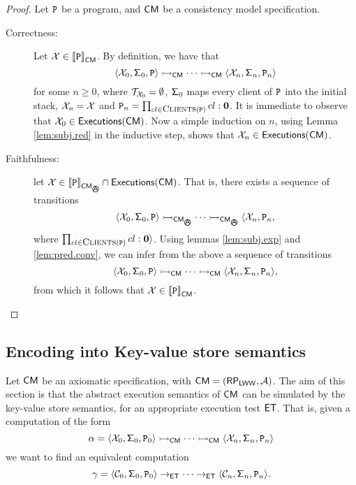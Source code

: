 \begin{proof}
Let $\texttt{P}$ be a program, and $\mathsf{CM}$ be a consistency model specification.
\begin{description}
\item[Correctness:] Let $\mathcal{X} \in {\llbracket \texttt{P}\rrbracket}_{\mathsf{CM}}$. By definition, we have that 
\[ 
\langle \mathcal{X}_0, \mathsf{\Sigma}_{0}, \texttt{P} \rangle \rightarrowtail_{\mathsf{CM}} \cdots \rightarrowtail_{\mathsf{CM}} \langle \mathcal{X}_{n}, \mathsf{\Sigma}_{n}, 
\texttt{P}_{n} \rangle 
\]
for some $n \geq 0$, where $\mathcal{T}_{\mathcal{X}_0} = \emptyset$, $\mathsf{\Sigma}_{0}$ maps every client of $\texttt{P}$ into the initial stack, 
$\mathcal{X}_n = \mathcal{X}$
and $\prog_{n} = \prod_{\tid \in \Clients(\prog)} \tid: \nil$. It is immediate to observe that 
$\mathcal{X}_0 \in {\mathsf{Executions}}(\mathsf{CM})$. Now a simple induction on $n$, using Lemma \ref{lem:subj.red} 
in the inductive step, shows that $\mathcal{X}_n \in {\mathsf{Executions}}(\mathsf{CM})$.
\item[Faithfulness:] let $\aexec \in \interpr{\prog}_{\CM_{\anarchicsmall}} \cap \aeset(\CM)$. 
That is, there exists a sequence of transitions 
\[
\langle \aexec_0, \thdstackFun_{0}, \prog \rangle \absrightarrow_{\CM_{\anarchicsmall}} \cdots \absrightarrow_{\CM_{\anarchicsmall}} \langle \aexec_{n}, \prog_n, 
\]
where $\prod_{\tid \in \Clients(\prog)} \tid: \nil \rangle$.
Using lemmas \ref{lem:subj.exp} and \ref{lem:pred.conv}, we can infer from the above a sequence of transitions
\[
\langle \mathcal{X}_0, \mathsf{\Sigma}_{0}, \texttt{P} \rangle \rightarrowtail_{\mathsf{CM}} \cdots \rightarrowtail_{\mathsf{CM}} \langle \mathcal{X}_{n}, \mathsf{\Sigma}_{n}, 
\texttt{P}_{n} \rangle,
\]
from which it follows that $\mathcal{X} \in {\llbracket \texttt{P}\rrbracket}_{\mathsf{CM}}$.
\end{description}
\end{proof}

\subsection{Encoding into Key-value store semantics}
Let $\mathsf{CM}$ be an axiomatic specification, with $\mathsf{CM} = (\mathsf{RP}_{\mathsf{LWW}}, \mathcal{A})$. 
The aim of this section is that the abstract execution semantics of $\mathsf{CM}$ can be 
simulated by the key-value store semantics, for an appropriate execution test $\mathsf{ET}$. 
That is, given a computation of the form 
\[
\alpha = \langle \mathcal{X}_0, \mathsf{\Sigma}_{0}, \texttt{P}_0 \rangle \rightarrowtail_{\mathsf{CM}} \cdots \rightarrowtail_{\mathsf{CM}} \langle \mathcal{X}_{n}, \mathsf{\Sigma}_{n}, \texttt{P}_{n} \rangle
\]
we want to find an equivalent computation 
\[
\gamma = \langle \mathcal{C}_{0}, \mathsf{\Sigma}_{0}, \texttt{P}_0 \rangle \rightarrow_{\mathsf{ET}} \cdots \rightarrow_{\mathsf{ET}} \langle \mathcal{C}_n, \mathsf{\Sigma}_{n}, \texttt{P}_{n} 
\rangle.
\]

